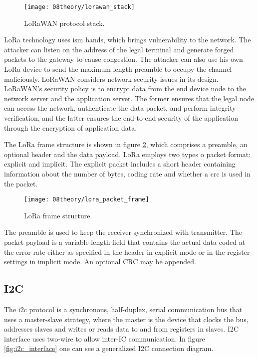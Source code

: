 \begin{figure}[H]
	\centering
	\texttt{[image: 08theory/lorawan\_stack]}
	\caption{LoRaWAN protocol stack.}
	\label{fig:lorawan_stack}
\end{figure}

LoRa technology uses \ac{ism} bands, which brings vulnerability to the network. The attacker can listen on the address of the legal terminal and generate forged packets to the gateway to cause congestion. The attacker can also use his own LoRa device to send the maximum length preamble to occupy the channel maliciously. LoRaWAN considers network security issues in its design. LoRaWAN’s security policy is to encrypt data from the end device node to the network server and the application server. The former ensures that the legal node can access the network, authenticate the data packet, and perform integrity verification, and the latter ensures the end-to-end security of the application through the encryption of application data. \cite{lora_physical_layer}

The LoRa frame structure is shown in figure \ref{fig:lora_packet_frame}, which comprises a preamble, an optional header and the data payload. LoRa employs two types o packet format: explicit and implicit. The explicit packet includes a short header containing information about the number of bytes, coding rate and whether a \ac{crc} is used in the packet.

\begin{figure}[H]
	\centering
	\texttt{[image: 08theory/lora\_packet\_frame]}
	\caption{LoRa frame structure.}
	\label{fig:lora_packet_frame}
\end{figure}

The preamble is used to keep the receiver synchronized with transmitter. The packet payload is a variable-length field that contains the actual data coded at the error rate either as specified in the header  in  explicit  mode  or  in  the  register  settings  in  implicit  mode. An  optional  CRC  may  be  appended. 

\clearpage
\subsection{I2C}
The \ac{i2c} protocol is a synchronous, half-duplex, serial communication bus that uses a master-slave strategy, where the master is the device that clocks the bus, addresses slaves and writes or reads data to and from registers in slaves. I2C interface uses two-wire to allow inter-IC communication. In figure \ref{fig:i2c_interface} one can see a generalized I2C connection diagram. \cite{i2c_interface}

